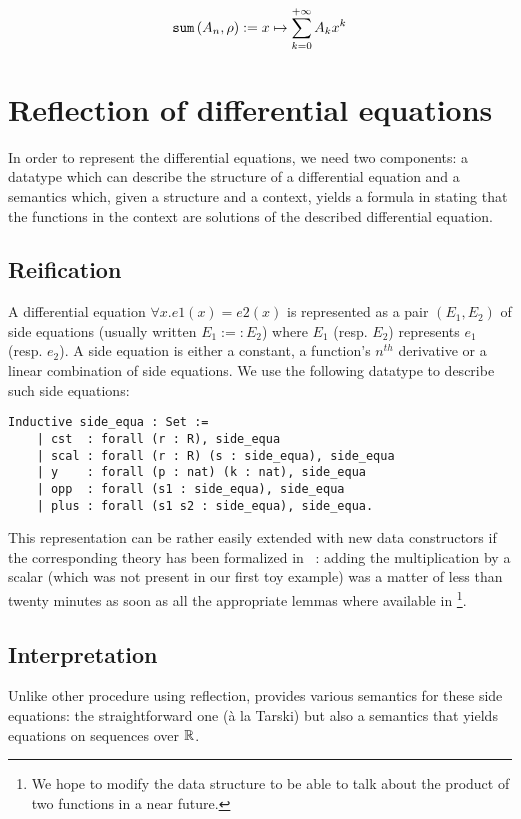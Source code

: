 \documentclass{article}
\begin{document}
$$\operatorname{\mathtt{sum}}{}(A_n, \rho) := x \mapsto \sum_{k=0}^{+ \infty} A_k x^k$$

\section{Reflection of differential equations}

In order to represent the differential equations, we need two components: a
datatype which can describe the structure of a differential equation and a
semantics which, given a structure and a context, yields a formula in
\Prop{} stating that the functions in the context are solutions of the
described differential equation.

\subsection{Reification}

A differential equation $\forall x. e1(x) = e2(x)$ is represented as a pair
$(E_1, E_2)$ of side equations (usually written $E_1 :=: E_2$) where $E_1$ (resp.
$E_2$) represents $e_1$ (resp. $e_2$). A side equation is either a constant,
a function's $n^{th}$ derivative or a linear combination of side equations. We
use the following datatype to describe such side equations:


\begin{verbatim}
Inductive side_equa : Set :=
    | cst  : forall (r : R), side_equa
    | scal : forall (r : R) (s : side_equa), side_equa
    | y    : forall (p : nat) (k : nat), side_equa
    | opp  : forall (s1 : side_equa), side_equa
    | plus : forall (s1 s2 : side_equa), side_equa.
\end{verbatim}

This representation can be rather easily extended with new data constructors if
the corresponding theory has been formalized in \coq{}~\cite{coq}: adding the multiplication
by a scalar (which was not present in our first toy example) was a matter of less
than twenty minutes as soon as all the appropriate lemmas where available in
\Rpser{}\footnote{We hope to modify the data structure to be able to talk about
the product of two functions in a near future.}.

\subsection{Interpretation}

Unlike other procedure using reflection, \dequa{} provides various semantics for
these side equations: the straightforward one (\`a la Tarski) but also a semantics
that yields equations on sequences over $\mathbb{R}$.
\end{document}
